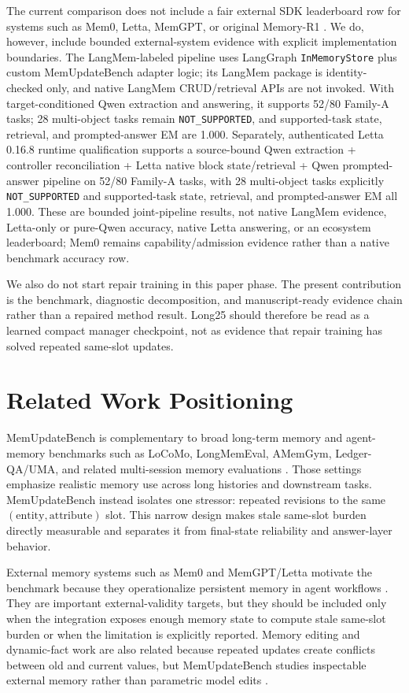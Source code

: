 \documentclass[11pt]{article}
\begin{document}
The current comparison does not include a fair external SDK leaderboard row for systems such as Mem0, Letta, MemGPT, or original Memory-R1 \citep{mem0,letta,memgpt,memoryr1}. We do, however, include bounded external-system evidence with explicit implementation boundaries. The LangMem-labeled pipeline uses LangGraph \texttt{InMemoryStore} plus custom MemUpdateBench adapter logic; its LangMem package is identity-checked only, and native LangMem CRUD/retrieval APIs are not invoked. With target-conditioned Qwen extraction and answering, it supports 52/80 Family-A tasks; 28 multi-object tasks remain \texttt{NOT\_SUPPORTED}, and supported-task state, retrieval, and prompted-answer EM are 1.000. Separately, authenticated Letta 0.16.8 runtime qualification supports a source-bound Qwen extraction + controller reconciliation + Letta native block state/retrieval + Qwen prompted-answer pipeline on 52/80 Family-A tasks, with 28 multi-object tasks explicitly \texttt{NOT\_SUPPORTED} and supported-task state, retrieval, and prompted-answer EM all 1.000. These are bounded joint-pipeline results, not native LangMem evidence, Letta-only or pure-Qwen accuracy, native Letta answering, or an ecosystem leaderboard; Mem0 remains capability/admission evidence rather than a native benchmark accuracy row.

We also do not start repair training in this paper phase. The present contribution is the benchmark, diagnostic decomposition, and manuscript-ready evidence chain rather than a repaired method result. Long25 should therefore be read as a learned compact manager checkpoint, not as evidence that repair training has solved repeated same-slot updates.

\section{Related Work Positioning}

MemUpdateBench is complementary to broad long-term memory and agent-memory benchmarks such as LoCoMo, LongMemEval, AMemGym, Ledger-QA/UMA, and related multi-session memory evaluations \citep{locomo,longmemeval,amemgym,ledgerqa_uma}. Those settings emphasize realistic memory use across long histories and downstream tasks. MemUpdateBench instead isolates one stressor: repeated revisions to the same \((\mathrm{entity}, \mathrm{attribute})\) slot. This narrow design makes stale same-slot burden directly measurable and separates it from final-state reliability and answer-layer behavior.

External memory systems such as Mem0 and MemGPT/Letta motivate the benchmark because they operationalize persistent memory in agent workflows \citep{mem0,memgpt,letta}. They are important external-validity targets, but they should be included only when the integration exposes enough memory state to compute stale same-slot burden or when the limitation is explicitly reported. Memory editing and dynamic-fact work are also related because repeated updates create conflicts between old and current values, but MemUpdateBench studies inspectable external memory rather than parametric model edits \citep{knowledge_editing_survey}.
\end{document}
